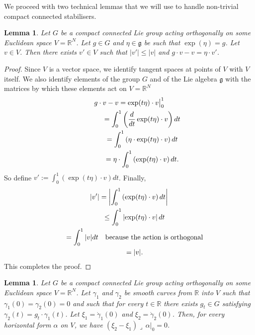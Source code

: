 \documentclass[pdftex]{sigma}
\numberwithin{equation}{section}
\newtheorem{Lemma}[Theorem]{Lemma}
\newcommand{\RR}{{\mathbb{R}}} %
\newcommand{\g}{{\mathfrak{g}}} %
\newcommand{\hook}{{\lrcorner\,}} %
\begin{document}

We proceed with two technical lemmas that we will use
to handle non-trivial compact connected stabilisers.

\begin{Lemma}\label{l:techn1}
Let $G$ be a compact connected Lie group acting orthogonally
on some Euclidean space $V = \RR^N$.
Let $g \in G$ and $\eta \in \g$ be such that $\exp(\eta) = g$.
Let $v \in V$. Then there exists $v' \in V$
such that $|v'| \leq |v|$ and $g \cdot v - v = \eta \cdot v'$.
\end{Lemma}

\begin{proof}
Since $V$ is a vector space, we identify tangent spaces at points of $V$
with $V$ itself.
We also identify elements of the group $G$ and of the Lie algebra $\g$
with the matrices by which these elements act on $V=\RR^N$
\begin{gather*}
 g \cdot v - v = \exp(t\eta) \cdot v \big|_0^1\\
\hphantom{g \cdot v - v}{}
 = \int_0^1 \left( \frac{d}{dt} \exp(t\eta) \cdot v\right) dt\\
\hphantom{g \cdot v - v}{}
 = \int_0^1 \left( \eta \cdot \exp(t\eta) \cdot v\right) dt \\
 \hphantom{g \cdot v - v}{}
 = \eta \cdot \int_0^1 \left( \exp(t\eta) \cdot v \right) dt.
\end{gather*}
So def\/ine $v':=\int_0^1\left(\exp(t\eta)\cdot v\right)dt$. Finally,
\begin{gather*}
 |v'| = \left| \int_0^1 \left( \exp(t\eta) \cdot v \right) dt \right|\\
\hphantom{|v'|}{}
 \leq \int_0^1 \left| \exp(t\eta) \cdot v\right| dt\\
 \hphantom{|v'|}{}
 = \int_0^1 |v| dt \quad \text{because the action is orthogonal} \\
\hphantom{|v'|}{} = |v|.
\end{gather*}
This completes the proof.
\end{proof}

\begin{Lemma}\label{l:techn2}
Let $G$ be a compact connected Lie group acting orthogonally
on some Euclidean space $V = \RR^N$.
Let $\gamma_1$ and $\gamma_2$ be smooth curves from $\RR$ into $V$
such that $ \gamma_1(0) = \gamma_2(0) = 0 $
and such that for every $t \in \RR$ there exists $g_t \in G$
satisfying $\gamma_2(t) = g_t \cdot \gamma_1(t)$.
Let $\xi_1 = \dot{\gamma}_1(0)$ and $\xi_2 = \dot{\gamma}_2(0)$.
Then, for every horizontal form $\alpha$ on $V$,
we have $(\xi_2-\xi_1)\hook\alpha|_0=0$.
\end{Lemma}
\end{document}
